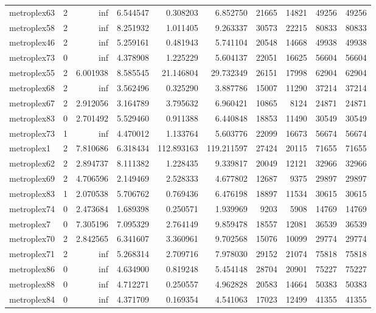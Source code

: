 \begin{longtable}{|l|r|r|r|r|r|r|r|r|r|}
metroplex63 & 2 & inf & 6.544547 & 0.308203 & 6.852750 & 21665 & 14821 & 49256 & 49256 \\
metroplex58 & 2 & inf & 8.251932 & 1.011405 & 9.263337 & 30573 & 22215 & 80833 & 80833 \\
metroplex46 & 2 & inf & 5.259161 & 0.481943 & 5.741104 & 20548 & 14668 & 49938 & 49938 \\
metroplex73 & 0 & inf & 4.378908 & 1.225229 & 5.604137 & 22051 & 16625 & 56604 & 56604 \\
metroplex55 & 2 & 6.001938 & 8.585545 & 21.146804 & 29.732349 & 26151 & 17998 & 62904 & 62904 \\
metroplex68 & 2 & inf & 3.562496 & 0.325290 & 3.887786 & 15007 & 11290 & 37214 & 37214 \\
metroplex67 & 2 & 2.912056 & 3.164789 & 3.795632 & 6.960421 & 10865 & 8124 & 24871 & 24871 \\
metroplex83 & 0 & 2.701492 & 5.529460 & 0.911388 & 6.440848 & 18853 & 11490 & 30549 & 30549 \\
metroplex73 & 1 & inf & 4.470012 & 1.133764 & 5.603776 & 22099 & 16673 & 56674 & 56674 \\
metroplex1 & 2 & 7.810686 & 6.318434 & 112.893163 & 119.211597 & 27424 & 20115 & 71655 & 71655 \\
metroplex62 & 2 & 2.894737 & 8.111382 & 1.228435 & 9.339817 & 20049 & 12121 & 32966 & 32966 \\
metroplex69 & 2 & 4.706596 & 2.149469 & 2.528333 & 4.677802 & 12687 & 9375 & 29897 & 29897 \\
metroplex83 & 1 & 2.070538 & 5.706762 & 0.769436 & 6.476198 & 18897 & 11534 & 30615 & 30615 \\
metroplex74 & 0 & 2.473684 & 1.689398 & 0.250571 & 1.939969 & 9203 & 5908 & 14769 & 14769 \\
metroplex7 & 0 & 7.305196 & 7.095329 & 2.764149 & 9.859478 & 18557 & 12081 & 36539 & 36539 \\
metroplex70 & 2 & 2.842565 & 6.341607 & 3.360961 & 9.702568 & 15076 & 10099 & 29774 & 29774 \\
metroplex71 & 2 & inf & 5.268314 & 2.709716 & 7.978030 & 29152 & 21074 & 75818 & 75818 \\
metroplex86 & 0 & inf & 4.634900 & 0.819248 & 5.454148 & 28704 & 20901 & 75227 & 75227 \\
metroplex88 & 0 & inf & 4.712271 & 0.250557 & 4.962828 & 20583 & 14664 & 50383 & 50383 \\
metroplex84 & 0 & inf & 4.371709 & 0.169354 & 4.541063 & 17023 & 12499 & 41355 & 41355 \\

\end{longtable}
